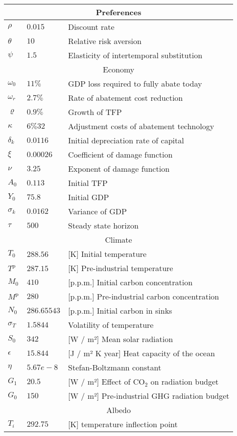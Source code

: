 \documentclass[../../main.tex]{subfiles}
\begin{document}
\begin{longtable}{ |p{1cm}||p{3cm}|p{8cm}|  }
    \hline
    \multicolumn{3}{|c|}{Preferences} \\
    \hline
    $\rho$ & $0.015$ & Discount rate \\
    $\theta$ & $10$ & Relative risk aversion \\
    $\psi$ & $1.5$ & Elasticity of intertemporal substitution \\
    \hline\hline
    \multicolumn{3}{|c|}{Economy} \\
    \hline
    $\omega_0$ & $11 \%$ & GDP loss required to fully abate today\\
    $\omega_r$ & $2.7 \%$ & Rate of abatement cost reduction \\
    $\varrho$ & $0.9 \%$ & Growth of TFP \\
    $\kappa$ & $6\%32$ & Adjustment costs of abatement technology \\
    $\delta_k$ & $0.0116$ & Initial depreciation rate of capital \\
    $\xi$ & $0.00026$ & Coefficient of damage function \\
    $\nu$ & $3.25$ & Exponent of damage function \\
    $A_0$ & $0.113$ & Initial TFP \\
    $Y_0$ & $75.8$ & Initial GDP \\
    $\sigma_k$ & $0.0162$ & Variance of GDP \\
    $\tau$ & $500$ & Steady state horizon  \\
    \hline
    \hline 
    \multicolumn{3}{|c|}{Climate} \\
    \hline
    $T_0$ & 288.$56$ & [K] Initial temperature \\
    $T^{\mathrm{p}}$ & 287.$15$ & [K] Pre-industrial temperature \\
    $M_0$ & $410$ & [p.p.m.] Initial carbon concentration \\
    $M^{\mathrm{p}}$ & $280$ & [p.p.m.] Pre-industrial carbon concentration \\
    $N_0$ & $286.65543$ & [p.p.m.] Initial carbon in sinks \\
    $\sigma_T$ & $1.5844$ & Volatility of temperature \\
    $S_0$ & $342$ & [W / m²] Mean solar radiation \\
    $\epsilon$ & $15.844$ & [J / m² K year] Heat capacity of the ocean \\
    $\eta$ & $5.67e-8$ & Stefan-Boltzmann constant  \\
    $G_1$ & $20.5$ & [W / m²] Effect of CO$_2$ on radiation budget \\
    $G_0$ & $150$ & [W / m²] Pre-industrial GHG radiation budget \\
    \hline\hline
    \multicolumn{3}{|c|}{Albedo} \\
    \hline 
    $T_i$ & $292.75$ & [K] temperature inflection point \\
    \hline
\end{longtable}
\end{document}
